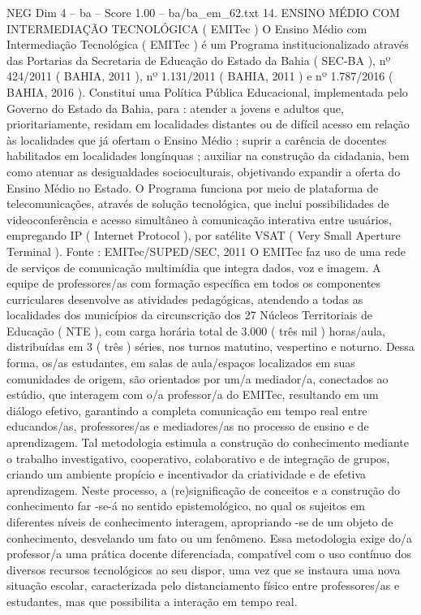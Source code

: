 \begin{textsample}{NEG Dim 4 – ba – Score 1.00 – ba/ba\_em\_62.txt}  \label{ex:f4_neg_270}
14.
ENSINO MÉDIO COM INTERMEDIAÇÃO TECNOLÓGICA ( EMITec ) O Ensino Médio com Intermediação Tecnológica ( EMITec ) é um Programa institucionalizado através das Portarias da Secretaria de Educação do Estado da Bahia ( SEC-BA ), nº 424/2011 ( BAHIA, 2011 ), nº 1.131/2011 ( BAHIA, 2011 ) e nº 1.787/2016 ( BAHIA, 2016 ).
Constitui uma Política Pública Educacional, implementada pelo Governo do Estado da Bahia, para : atender a jovens e adultos que, prioritariamente, residam em localidades distantes ou de difícil acesso em relação às localidades que já ofertam o Ensino Médio ; suprir a carência de docentes habilitados em localidades longínquas ; auxiliar na construção da cidadania, bem como atenuar as desigualdades socioculturais, objetivando expandir a oferta do Ensino Médio no Estado.
O Programa funciona por meio de plataforma de telecomunicações, através de solução tecnológica, que inclui possibilidades de videoconferência e acesso simultâneo à comunicação interativa entre usuários, empregando IP ( Internet Protocol ), por satélite VSAT ( Very Small Aperture Terminal ).
Fonte : EMITec/SUPED/SEC, 2011 O EMITec faz uso de uma rede de serviços de comunicação multimídia que integra dados, voz e imagem.
A equipe de professores/as com formação específica em todos os componentes curriculares desenvolve as atividades pedagógicas, atendendo a todas as localidades dos municípios da circunscrição dos 27 Núcleos Territoriais de Educação ( NTE ), com carga horária total de 3.000 ( três mil ) horas/aula, distribuídas em 3 ( três ) séries, nos turnos matutino, vespertino e noturno.
Dessa forma, os/as estudantes, em salas de aula/espaços localizados em suas comunidades de origem, são orientados por um/a mediador/a, conectados ao estúdio, que interagem com o/a professor/a do EMITec, resultando em um diálogo efetivo, garantindo a completa comunicação em tempo real entre educandos/as, professores/as e mediadores/as no processo de ensino e de aprendizagem.
Tal metodologia estimula a construção do conhecimento mediante o trabalho investigativo, cooperativo, colaborativo e de integração de grupos, criando um ambiente propício e incentivador da criatividade e de efetiva aprendizagem.
Neste processo, a (re)significação de conceitos e a construção do conhecimento far -se-á no sentido epistemológico, no qual os sujeitos em diferentes níveis de conhecimento interagem, apropriando -se de um objeto de conhecimento, desvelando um fato ou um fenômeno.
Essa metodologia exige do/a professor/a uma prática docente diferenciada, compatível com o uso contínuo dos diversos recursos tecnológicos ao seu dispor, uma vez que se instaura uma nova situação escolar, caracterizada pelo distanciamento físico entre professores/as e estudantes, mas que possibilita a interação em tempo real.

\end{textsample}
